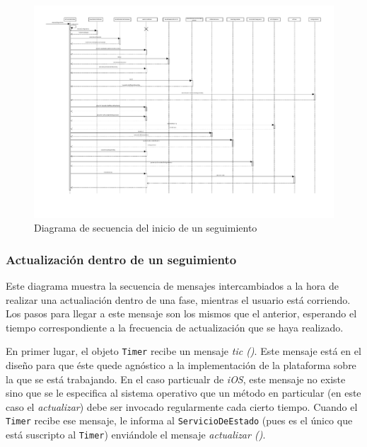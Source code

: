 \newpage
\begin{landscape}
	\begin{figure}[h]
		\includegraphics[scale=0.8]{images/InicioSeguimiento.pdf}
		\caption{Diagrama de secuencia del inicio de un seguimiento}
	\end{figure} 
\end{landscape}


\newpage

\subsubsection{Actualización dentro de un seguimiento} \label{unaSeccion}


Este diagrama muestra la secuencia de mensajes intercambiados a la hora de realizar una actualiación dentro de una fase, mientras el usuario está corriendo. Los pasos para llegar a este mensaje son los mismos que el anterior, esperando el tiempo correspondiente a la frecuencia de actualización que se haya realizado.


En primer lugar, el objeto \texttt{Timer} recibe un mensaje \emph{tic ()}. Este mensaje está en el diseño para que éste quede agnóstico a la implementación de la plataforma sobre la que se está trabajando. En el caso particualr de \emph{iOS}, este mensaje no existe sino que se le especifica al sistema operativo que un método en particular (en este caso el \emph{actualizar}) debe ser invocado regularmente cada cierto tiempo. Cuando el \texttt{Timer} recibe ese mensaje, le informa al \texttt{ServicioDeEstado} (pues es el único que está suscripto al \texttt{Timer}) enviándole el mensaje \emph{actualizar ()}.


